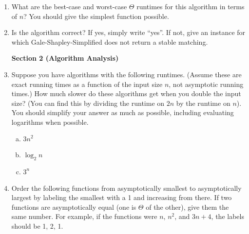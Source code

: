 \documentclass[11pt]{article}
\begin{document}
\begin{enumerate}
\item What are the best-case and worst-case $\Theta$ runtimes for this algorithm in terms of $n$? You should
give the simplest function possible.

\vspace{2in}

\item Is the algorithm correct? If yes, simply write ``yes''. If not, give an instance for which
Gale-Shapley-Simplified does not return a stable matching.

\newpage


\begin{center}
\LARGE\textbf{Section 2 (Algorithm Analysis)\\}%
\end{center}

\item 
Suppose you have algorithms with the following runtimes.
(Assume these are exact running times as a function of the input size $n$, not
asymptotic running times.) How much slower do these algorithms get when you
double the input size? (You can find this by dividing the runtime on $2n$ by the
runtime on $n$). You should simplify your answer as much as possible, including evaluating
logarithms when possible.

\begin{enumerate}[(a)]
    \item $3n^2$ 
\vspace{1in}
    \item $\log_2 n$
\vspace{1in}
    \item $3^{n}$
\vspace{1in}
\end{enumerate}


\item 
Order the following functions from asymptotically smallest to asymptotically
largest by labeling the smallest with a 1 and increasing from there.  If two
functions are asymptotically equal (one is $\Theta$ of the other), give them the
same number. For example, if the functions were $n$, $n^2$, and $3n + 4$, the
labels should be 1, 2, 1.


\end{enumerate}
\end{document}
